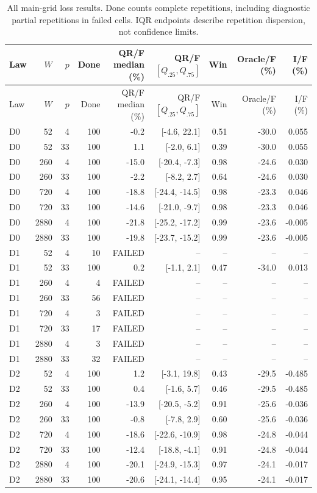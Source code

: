 \begin{longtable}{lrrr r rrrr}
\caption{All main-grid loss results. Done counts complete repetitions, including diagnostic partial repetitions in failed cells. IQR endpoints describe repetition dispersion, not confidence limits.}\label{tab:v8-mc-loss}\\
\toprule Law & $W$ & $p$ & Done & QR/F median (\%) & QR/F $[Q_{.25},Q_{.75}]$ & Win & Oracle/F (\%) & I/F (\%)\\\midrule
\endfirsthead
\toprule Law & $W$ & $p$ & Done & QR/F median (\%) & QR/F $[Q_{.25},Q_{.75}]$ & Win & Oracle/F (\%) & I/F (\%)\\\midrule\endhead
\bottomrule\endfoot
D0 & 52 & 4 & 100 & -0.2 & [-4.6, 22.1] & 0.51 & -30.0 & 0.055 \\
D0 & 52 & 33 & 100 & 1.1 & [-2.0, 6.1] & 0.39 & -30.0 & 0.055 \\
D0 & 260 & 4 & 100 & -15.0 & [-20.4, -7.3] & 0.98 & -24.6 & 0.030 \\
D0 & 260 & 33 & 100 & -2.2 & [-8.2, 2.7] & 0.64 & -24.6 & 0.030 \\
D0 & 720 & 4 & 100 & -18.8 & [-24.4, -14.5] & 0.98 & -23.3 & 0.046 \\
D0 & 720 & 33 & 100 & -14.6 & [-21.0, -9.7] & 0.98 & -23.3 & 0.046 \\
D0 & 2880 & 4 & 100 & -21.8 & [-25.2, -17.2] & 0.99 & -23.6 & -0.005 \\
D0 & 2880 & 33 & 100 & -19.8 & [-23.7, -15.2] & 0.99 & -23.6 & -0.005 \\
D1 & 52 & 4 & 10 & FAILED & -- & -- & -- & -- \\
D1 & 52 & 33 & 100 & 0.2 & [-1.1, 2.1] & 0.47 & -34.0 & 0.013 \\
D1 & 260 & 4 & 4 & FAILED & -- & -- & -- & -- \\
D1 & 260 & 33 & 56 & FAILED & -- & -- & -- & -- \\
D1 & 720 & 4 & 3 & FAILED & -- & -- & -- & -- \\
D1 & 720 & 33 & 17 & FAILED & -- & -- & -- & -- \\
D1 & 2880 & 4 & 3 & FAILED & -- & -- & -- & -- \\
D1 & 2880 & 33 & 32 & FAILED & -- & -- & -- & -- \\
D2 & 52 & 4 & 100 & 1.2 & [-3.1, 19.8] & 0.43 & -29.5 & -0.485 \\
D2 & 52 & 33 & 100 & 0.4 & [-1.6, 5.7] & 0.46 & -29.5 & -0.485 \\
D2 & 260 & 4 & 100 & -13.9 & [-20.5, -5.2] & 0.91 & -25.6 & -0.036 \\
D2 & 260 & 33 & 100 & -0.8 & [-7.8, 2.9] & 0.60 & -25.6 & -0.036 \\
D2 & 720 & 4 & 100 & -18.6 & [-22.6, -10.9] & 0.98 & -24.8 & -0.044 \\
D2 & 720 & 33 & 100 & -12.4 & [-18.8, -4.1] & 0.91 & -24.8 & -0.044 \\
D2 & 2880 & 4 & 100 & -20.1 & [-24.9, -15.3] & 0.97 & -24.1 & -0.017 \\
D2 & 2880 & 33 & 100 & -20.6 & [-24.1, -14.4] & 0.95 & -24.1 & -0.017 \\
\end{longtable}

